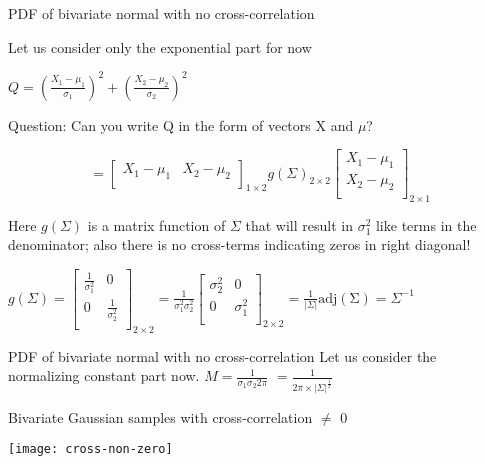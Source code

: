 \documentclass{beamer}
\begin{document}
\begin{frame}{PDF of bivariate normal with no cross-correlation}

Let us consider only the exponential part for now

$ Q =  \left(\frac{X_1-\mu_1}{\sigma_1}\right)^2 + \left(\frac{X_2-\mu_2}{\sigma_2}\right)^2 $

Question: Can you write Q in the form of vectors X and $\mu$?

$$
 = \begin{bmatrix}
	X_1 - \mu_1 &
	X_2 - \mu_2 \\
\end{bmatrix}_{1\times2}  g(\Sigma)_{2\times2} \begin{bmatrix}
X_1 - \mu_1 \\
X_2 - \mu_2 \\
\end{bmatrix}_{2\times1}
$$

Here $g(\Sigma)$ is a matrix function of $\Sigma$ that will result in $\sigma_1^2$ like terms in the denominator; also there is no cross-terms indicating zeros in right diagonal!

$g(\Sigma) = \begin{bmatrix}
 \frac{1}{\sigma_1^2}& 0  \\
 0 &  \frac{1}{\sigma_2^2} \\
\end{bmatrix}_{2\times2} = \frac{1}{\sigma_1^2 \sigma_2^2}\begin{bmatrix}
{\sigma_2^2}& 0  \\
0 &  {\sigma_1^2}   \\ 
\end{bmatrix}_{2\times2} = \frac{1}{|\Sigma|} \operatorname{adj(\Sigma)} = \Sigma^{-1}$
\end{frame}

\begin{frame}{PDF of bivariate normal with no cross-correlation}
Let us consider the normalizing constant part now.
$M = \frac{1}{\sigma_1 \sigma_2 2\pi }$
$=\frac{1}{2\pi \times |\Sigma|^{\frac{1}{2}}}$
\end{frame}

\begin{frame}{Bivariate Gaussian samples with cross-correlation  $\neq$ 0}
	\begin{center}
		\texttt{[image: cross-non-zero]}
	\end{center}
\end{frame}
\end{document}
